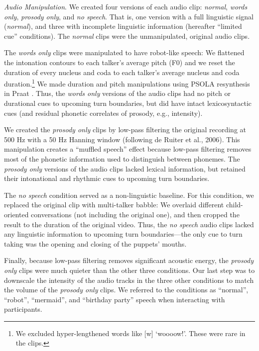 \documentclass[authoryear, 12pt]{elsarticle}
\begin{document}
\textit{Audio Manipulation}. We created four versions of each audio clip: \textit{normal}, \textit{words only}, \textit{prosody only}, and \textit{no speech}. That is, one version with a full linguistic signal (\textit{normal}), and three with incomplete linguistic information (hereafter ``limited cue'' conditions). The \textit{normal} clips were the unmanipulated, original audio clips. 

The \textit{words only} clips were manipulated to have robot-like speech: We flattened the intonation contours to each talker's average pitch (F0) and we reset the duration of every nucleus and coda to each talker's average nucleus and coda duration.\footnote{We excluded hyper-lengthened words like [w] `woooow!'. These were rare in the clips.} We made duration and pitch manipulations using PSOLA resynthesis in Praat \citep{Praat}. Thus, the \textit{words only} versions of the audio clips had no pitch or durational cues to upcoming turn boundaries, but did have intact lexicosyntactic cues (and residual phonetic correlates of prosody, e.g., intensity). 

We created the \textit{prosody only} clips by low-pass filtering the original recording at 500 Hz with a 50 Hz Hanning window (following de Ruiter et al., 2006). This manipulation creates a ``muffled speech'' effect because low-pass filtering removes most of the phonetic information used to distinguish between phonemes. The \textit{prosody only} versions of the audio clips lacked lexical information, but retained their intonational and rhythmic cues to upcoming turn boundaries. 

The \textit{no speech} condition served as a non-linguistic baseline. For this condition, we replaced the original clip with multi-talker babble: We overlaid different child-oriented conversations (not including the original one), and then cropped the result to the duration of the original video. Thus, the \textit{no speech} audio clips lacked any linguistic information to upcoming turn boundaries---the only cue to turn taking was the opening and closing of the puppets' mouths. 

Finally, because low-pass filtering removes significant acoustic energy, the \textit{prosody only} clips were much quieter than the other three conditions. Our last step was to downscale the intensity of the audio tracks in the three other conditions to match the volume of the \textit{prosody only} clips. We referred to the conditions as ``normal'', ``robot'', ``mermaid'', and ``birthday party'' speech when interacting with participants.
\end{document}

